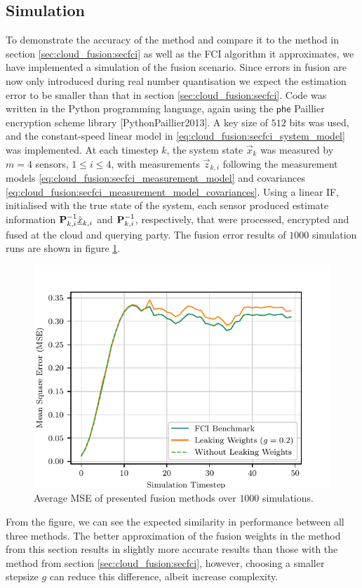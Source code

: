 \subsection{Simulation}\label{subsec:cloud_fusion:secfci2_simulation}
To demonstrate the accuracy of the method and compare it to the method in section \ref{sec:cloud_fusion:secfci} as well as the FCI algorithm it approximates, we have implemented a simulation of the fusion scenario. Since errors in fusion are now only introduced during real number quantisation we expect the estimation error to be smaller than that in section \ref{sec:cloud_fusion:secfci}. Code was written in the Python programming language, again using the $\mathsf{phe}$ Paillier encryption scheme library [PythonPaillier2013]. A key size of $512$ bits was used, and the constant-speed linear model in \eqref{eq:cloud_fusion:secfci_system_model} was implemented. At each timestep $k$, the system state $\vec{x}_k$ was measured by $m=4$ sensors, $1\leq i \leq 4$, with measurements $\vec{z}_{k,i}$ following the measurement models \eqref{eq:cloud_fusion:secfci_measurement_model} and covariances \eqref{eq:cloud_fusion:secfci_measurement_model_covariances}. Using a linear IF, initialised with the true state of the system, each sensor produced estimate information ${{\mathbf{P}}}_{k, i}^{-1}\hat{{\underline{x}}}_{k, i}$ and ${{\mathbf{P}}}_{k, i}^{-1}$, respectively, that were processed, encrypted and fused at the cloud and querying party. The fusion error results of $1000$ simulation runs are shown in figure \ref{fig:cloud_fusion:secfci2_sim_error}. 
\begin{figure}[htbp]
    \centering
    \includegraphics{figures/cloud_fusion_secfci2_sim_error.pdf}
    \caption{Average MSE of presented fusion methods over $1000$ simulations.}
    \label{fig:cloud_fusion:secfci2_sim_error}
\end{figure}
From the figure, we can see the expected similarity in performance between all three methods. The better approximation of the fusion weights in the method from this section results in slightly more accurate results than those with the method from section \ref{sec:cloud_fusion:secfci}, however, choosing a smaller stepsize $g$ can reduce this difference, albeit increase complexity.

